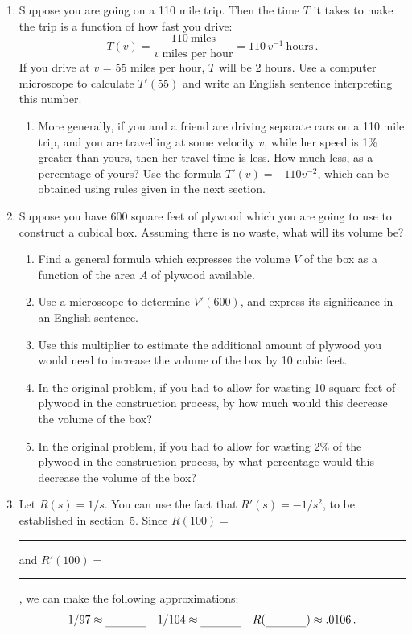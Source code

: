 \begin{enumerate}
\item Suppose you are going on a 110 mile trip.  Then the time $T$ it
takes to make the trip is a function of how fast you drive:
\[
T(v) = \dfrac{110\ \mbox{miles}}{v \ \mbox{miles per hour}} 
		= 110\,v^{-1} \ \mbox{hours} \, .
\]
If you drive at $v$ = 55 miles per hour, $T$ will be 2 hours.  Use a
computer microscope to calculate $T'(55)$ and write an English
sentence interpreting this number.

  \begin{enumerate}
  \item More generally, if you and a friend are driving separate cars on
a 110 mile trip, and you are travelling at some velocity $v$, while
her speed is 1\% greater than yours, then her travel time is less.
How much less, as a percentage of yours?  Use the formula
$T'(v)=-110v^{-2}$, which can be obtained using rules given in the
next section.


\end{enumerate}
\item Suppose you have 600 square feet of plywood which you are going
to use to construct a cubical box.  Assuming there is no waste, what
will its volume be?

  \begin{enumerate}
  \item Find a general formula which expresses the volume $V$ of the box
as a function of the area $A$ of plywood available.

  \item Use a microscope to determine $V'(600)$, and express its
significance in an English sentence.

  \item Use this multiplier to estimate the additional amount of plywood
you would need to increase the volume of the box by 10 cubic feet.

  \item In the original problem, if you had to allow for wasting 10
square feet of plywood in the construction process, by how much would
this decrease the volume of the box?

  \item In the original problem, if you had to allow for wasting 2\% of
the plywood in the construction process, by what percentage would this
decrease the volume of the box?


\end{enumerate}
\item Let $R(s) = 1/s$.  You can use the fact that $R'(s) = - 1/s^2$,
to be established in section~5.  Since $R(100) =$
\rule[-3pt]{1in}{.3pt} and $R'(100) =$ \rule[-3pt]{1in}{.3pt}, we can
make the following approximations:
\[
1/97 \approx \rule[-3pt]{.5in}{.3pt} \quad
	1/104 \approx \rule[-3pt]{.5in}{.3pt} \quad 	
	R(\rule[-3pt]{.5in}{.3pt}) \approx .0106 \, .
\]



\end{enumerate}

